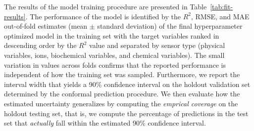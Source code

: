 \documentclass[remotesensing,article,submit,pdftex,moreauthors]{Definitions/mdpi}
\begin{document}
The results of the model training procedure are presented in Table~\ref{tab:fit-results}. The performance of the model is identified by the $R^2$, RMSE, and MAE out-of-fold estimates (mean $\pm$ standard deviation) of the final hyperparameter optimized model in the training set with the target variables ranked in descending order by the $R^2$ value and separated by sensor type (physical variables, ions, biochemical variables, and chemical variables). The small variation in values across folds confirms that the reported performance is independent of how the training set was sampled. Furthermore, we report the interval width that yields a 90\% confidence interval on the holdout validation set determined by the conformal prediction procedure. We then evaluate how the estimated uncertainty generalizes by computing the \textit{emprical coverage} on the holdout testing set, that is, we compute the percentage of predictions in the test set that \textit{actually} fall within the estimated 90\% confidence interval. 
\end{document}

